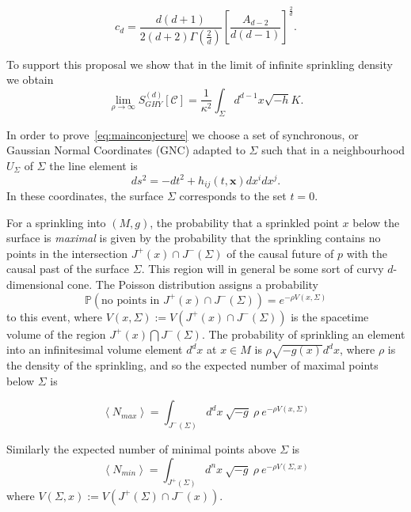 \documentclass[12pt]{article}
\newcommand{\be}{\begin{equation}}
\newcommand{\ee}{\end{equation}}
\begin{document}
\be\label{Cn}
c_{d}=\frac{d(d+1)}{2(d+2)\Gamma\left(\frac{2}{d}\right)}\left[\frac{A_{d-2}}{d(d-1)}\right]^{\frac{2}{d}}.
\ee

To support this proposal we show that in the limit of infinite sprinkling density we obtain
\be
\lim_{\rho\rightarrow\infty}S^{(d)}_{GHY}[\mathcal C] = \frac1{\kappa^2} \int_{\Sigma} d^{d-1}x \sqrt{-h} K.\label{eq:mainconjecture}
\ee

In order to prove~\eqref{eq:mainconjecture} we choose a set of synchronous, or Gaussian Normal Coordinates (GNC) adapted to $\Sigma$ such that in a neighbourhood $U_\Sigma$ of $\Sigma$ the line element is
\be
ds^2 = -dt^2 + h_{ij}(t,\mathbf x) dx^i dx^j.
\ee
In these coordinates, the surface $\Sigma$ corresponds to the set $t=0$. 

For a sprinkling into $(M,g)$, the probability that a sprinkled point $x$ below the surface is \emph{maximal} is given by the probability that the sprinkling contains no points in the intersection $J^{+}(x)\cap J^{-}(\Sigma)$ of the causal future of $p$ with the causal past of the surface $\Sigma$. This region will in general be some sort of curvy $d$-dimensional cone. The Poisson distribution assigns a probability
\be\label{Poisson}
\mathbb P\left(\text{no points in }J^{+}(x)\cap J^{-}(\Sigma)\right)=e^{-\rho V(x,\Sigma)}
\ee
to this event, where $V(x,\Sigma):=V(J^{+}(x)\cap J^{-}(\Sigma))$ is the spacetime volume of the region $J^{+}(x)\bigcap J^{-}(\Sigma)$. The probability of sprinkling an element into an infinitesimal volume element $d^dx$ at $x\in M$ is $\rho\sqrt{-g(x)}d^dx$, where $\rho$ is the density of the sprinkling, and so the expected number of maximal points below $\Sigma$ is

\be\label{eq:nmax}
\left\langle N_{max}\right\rangle =\int_{J^{-}(\Sigma)}d^{d}x\:\sqrt{-g}\ \rho\ e^{-\rho V(x,\Sigma)}
\ee

Similarly the expected number of minimal points above $\Sigma$ is
\be\label{eq:nmin}
\left\langle N_{min}\right\rangle =\int_{J^{+}(\Sigma)}d^{n}x\:\sqrt{-g}\ \rho\ e^{-\rho V(\Sigma,x)}
\ee
where $V(\Sigma,x):=V(J^{+}(\Sigma)\cap J^{-}(x))$.
\end{document}
